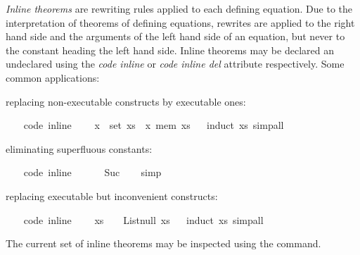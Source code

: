 \begin{isabellebody}
\begin{isamarkuptext}
  \emph{Inline theorems} are rewriting rules applied to each
  defining equation.  Due to the interpretation of theorems
  of defining equations, rewrites are applied to the right
  hand side and the arguments of the left hand side of an
  equation, but never to the constant heading the left hand side.
  Inline theorems may be declared an undeclared using the
  \emph{code inline} or \emph{code inline del} attribute respectively.
  Some common applications:%
\end{isamarkuptext}%
\isamarkuptrue%
%
\begin{itemize}
%
\begin{isamarkuptext}%
\item replacing non-executable constructs by executable ones:%
\end{isamarkuptext}%
\isamarkuptrue%
\ \ \isamarkupfalse%
\ {\isacharbrackleft}code\ inline{\isacharbrackright}{\isacharcolon}\isanewline
\ \ \ \ {\isachardoublequoteopen}x\ {\isasymin}\ set\ xs\ {\isasymlongleftrightarrow}\ x\ mem\ xs{\isachardoublequoteclose}%
\isadelimproof
\ %
\endisadelimproof
%
\isatagproof
{}\isamarkupfalse%
\ {\isacharparenleft}induct\ xs{\isacharparenright}\ simp{\isacharunderscore}all%
\endisatagproof
{\isafoldproof}%
%
\isadelimproof
%
\endisadelimproof
%
\begin{isamarkuptext}%
\item eliminating superfluous constants:%
\end{isamarkuptext}%
\isamarkuptrue%
\ \ \isamarkupfalse%
\ {\isacharbrackleft}code\ inline{\isacharbrackright}{\isacharcolon}\isanewline
\ \ \ \ {\isachardoublequoteopen}{}\ {\isacharequal}\ Suc\ {}{\isachardoublequoteclose}%
\isadelimproof
\ %
\endisadelimproof
%
\isatagproof
{}\isamarkupfalse%
\ simp%
\endisatagproof
{\isafoldproof}%
%
\isadelimproof
%
\endisadelimproof
%
\begin{isamarkuptext}%
\item replacing executable but inconvenient constructs:%
\end{isamarkuptext}%
\isamarkuptrue%
\ \ \isamarkupfalse%
\ {\isacharbrackleft}code\ inline{\isacharbrackright}{\isacharcolon}\isanewline
\ \ \ \ {\isachardoublequoteopen}xs\ {\isacharequal}\ {\isacharbrackleft}{\isacharbrackright}\ {\isasymlongleftrightarrow}\ List{\isachardot}null\ xs{\isachardoublequoteclose}%
\isadelimproof
\ %
\endisadelimproof
%
\isatagproof
{}\isamarkupfalse%
\ {\isacharparenleft}induct\ xs{\isacharparenright}\ simp{\isacharunderscore}all%
\endisatagproof
{\isafoldproof}%
%
\isadelimproof
%
\endisadelimproof
%
\end{itemize}
%
\begin{isamarkuptext}%
\noindent The current set of inline theorems may be inspected using
  the \isa{{\isasymPRINTCODESETUP}} command.


\end{isamarkuptext}
\end{isabellebody}
